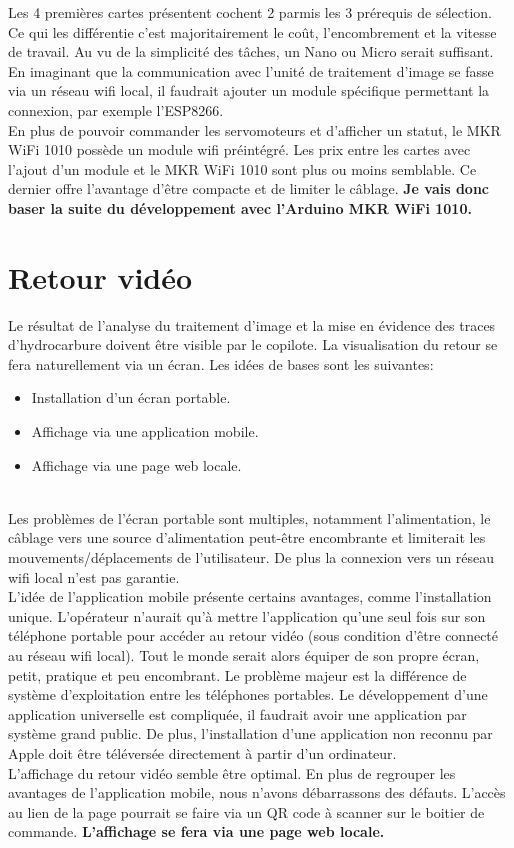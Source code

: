 Les 4 premières cartes présentent cochent 2 parmis les 3 prérequis de sélection. Ce qui les différentie c'est majoritairement le coût, l'encombrement et la vitesse de travail.
Au vu de la simplicité des tâches, un Nano ou Micro serait suffisant. En imaginant que la communication avec l'unité de traitement d'image se fasse via un réseau \Gls{wifi} local,
il faudrait ajouter un module spécifique permettant la connexion, par exemple l'ESP8266.\\
En plus de pouvoir commander les servomoteurs et d'afficher un statut, le MKR WiFi 1010 possède un module \Gls{wifi} préintégré.
Les prix entre les cartes avec l'ajout d'un module et le MKR WiFi 1010 sont plus ou moins semblable. Ce dernier offre l'avantage d'être compacte et de limiter le câblage.
\textbf{Je vais donc baser la suite du développement avec l'Arduino MKR WiFi 1010.} \cite{MKR}
\section{Retour vidéo}
Le résultat de l'analyse du traitement d'image et la mise en évidence des traces d'hydrocarbure doivent être visible par le copilote.
La visualisation du retour se fera naturellement via un écran. Les idées de bases sont les suivantes:
\begin{itemize}
    \item Installation d'un écran portable.
    \item Affichage via une application mobile.
    \item Affichage via une page web locale.
\end{itemize}
\\
Les problèmes de l'écran portable sont multiples, notamment l'alimentation, le câblage vers une source d'alimentation peut-être encombrante
et limiterait les mouvements/déplacements de l'utilisateur. De plus la connexion vers un réseau \Gls{wifi} local n'est pas garantie.\\
L'idée de l'application mobile présente certains avantages, comme l'installation unique. L'opérateur n'aurait qu'à mettre l'application
qu'une seul fois sur son téléphone portable pour accéder au retour vidéo (sous condition d'être connecté au réseau \Gls{wifi} local).
Tout le monde serait alors équiper de son propre écran, petit, pratique et peu encombrant. Le problème majeur est la différence de système d'exploitation
entre les téléphones portables. Le développement d'une application universelle est compliquée, il faudrait avoir une application par système grand public.
De plus, l'installation d'une application non reconnu par Apple doit être téléversée directement à partir d'un ordinateur.\\
L'affichage du retour vidéo semble être optimal. En plus de regrouper les avantages de l'application mobile, nous n'avons débarrassons des défauts.
L'accès au lien de la page pourrait se faire via un QR code à scanner sur le boitier de commande.
\textbf{L'affichage se fera via une page web locale.}

